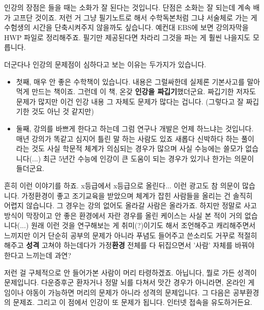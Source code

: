 인강의 장점은 들을 때는 소화가 잘 된다는 것입니다. 단점은 소화는 잘 되는데 계속 배가 고프단 것이죠.
저런 거 그냥 필기노트로 해서 수학독본처럼 그냐 서술체로 가는 게 수험생의 시간을 단축시켜주지 않을까도 싶습니다.
예컨대 EBS에 보면 강의자막을 HWP 파일로 정리해주죠. 필기만 제공된다면 차라리 그것을 파는 게 훨씬 나을지도 모릅니다.
\vspace{5mm}

더군다나 인강의 문제점이 심하다고 보는 이유는 두가지가 있습니다.
\vspace{5mm}

\begin{itemize}
    \item 첫째, 매우 안 좋은 수학책이 있습니다.
    내용은 그럴싸한데 실제론 기본사고를 말아먹게 만드는 책이죠.
    그런데 이 책, 온갖 \textbf{인강을 짜깁기}했더군요. 짜깁기한 저자도 문제가 많지만 이건 인강 내용 그 자체도 문제가 많다는 겁니다.
    (그렇다고 잘 짜깁기한 것도 아닌 것 같지만)
    \vspace{5mm}

    \item 둘째, 강의를 바쁘게 한다고 하는데 그럼 연구나 개발은 언제 하느냐는 것입니다. 매년 강의가 똑같고 심지어 틀린 말 하는 사람도 있죠
    새롭다 신박하다 하는 풀이라는 것도 사실 학문적 체계가 의심되는 경우가 많으며 사실 수능에는  쓸모가 없습니다(...)
    최근 5년간 수능에 인강이 큰 도움이 되는 경우가 있기나 한가는 의문이 들더군요.
\end{itemize}
\vspace{5mm}

흔히 이런 이야기를 하죠. x등급에서 x등급으로 올린다... 이런 광고도 참 의문이 많습니다.
가정환경이 좋고 조기교육을 받았으며 체계가 잡힌 사람들을 올리는 건 솔직히 어렵지 않습니다. 그 경우는 강의 없어도 올라갈 사람은 올라가죠.
하지만 정말로 사고방식이 막장이고 안 좋은 환경에서 자란 경우를 올린 케이스는 사실 본 적이 거의 없습니다(...)
원래 이런 것을 연구해보는 게 취미(?)이기도 해서 조언해주고 캐리해주면서 느끼지만
이거 단순히 공부의 문제가 아니라 푸념도 들어주고 쓴소리도 거꾸로 적절히 해주고 \textbf{성격} 고쳐야 하는데다가
가정\textbf{환경} 전체를 다 뒤집으면서 '사람' 자체를 바꿔야한다고 느끼는데 과연?
\vspace{5mm}

저런 걸 구체적으로 안 들어가본 사람이 머리 타령하겠죠. 아닙니다, 뭘로 가든 성격이 문제입니다.
다운증후군 환자거나 정말 뇌를 다쳐서 맛간 경우가 아니라면, 온라인 게임이나 야동이 가능하면 머리의 문제가 아니라 성격의 문제입니다.
그 다음은 공부환경의 문제죠. 그리고 이 점에서 인강이 또 문제가 됩니다. 인터넷 접속을 유도하거든요.
\vspace{5mm}

